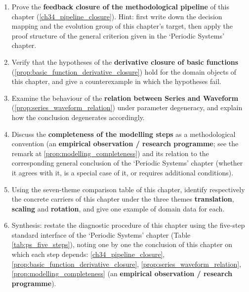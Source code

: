 \begin{enumerate}[leftmargin=3em, label=\textbf{Exercise \arabic*}]
    \item Prove the \textbf{feedback closure of the methodological pipeline} of this chapter (\ref{ch34_pipeline_closure}). Hint: first write down the decision mapping and the evolution group of this chapter's target, then apply the proof structure of the general criterion given in the `Periodic Systems' chapter.

    \item Verify that the hypotheses of the \textbf{derivative closure of basic functions} (\ref{prop:basic_function_derivative_closure}) hold for the domain objects of this chapter, and give a counterexample in which the hypotheses fail.

    \item Examine the behaviour of the \textbf{relation between Series and Waveform} (\ref{prop:series_waveform_relation}) under parameter degeneracy, and explain how the conclusion degenerates accordingly.

    \item Discuss the \textbf{completeness of the modelling steps} as a methodological convention (an \textbf{empirical observation / research programme}; see the remark at \ref{prop:modelling_completeness}) and its relation to the corresponding general conclusion of the `Periodic Systems' chapter (whether it agrees with it, is a special case of it, or requires additional conditions).

    \item Using the seven-theme comparison table of this chapter, identify respectively the concrete carriers of this chapter under the three themes \textbf{translation}, \textbf{scaling} and \textbf{rotation}, and give one example of domain data for each.

    \item Synthesis: restate the diagnostic procedure of this chapter using the five-step standard interface of the `Periodic Systems' chapter (Table \ref{tab:ps_five_steps}), noting one by one the conclusion of this chapter on which each step depends: \ref{ch34_pipeline_closure}, \ref{prop:basic_function_derivative_closure}, \ref{prop:series_waveform_relation}, \ref{prop:modelling_completeness} (an \textbf{empirical observation / research programme}).
\end{enumerate}


